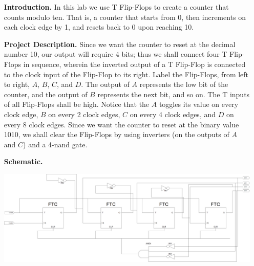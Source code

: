 \documentclass[9pt]{article}
\begin{document}
\begin{enumerate}
   \item[\textbf{Introduction.}]  In this lab we use T Flip-Flops to create a
   counter that counts modulo ten. That is, a counter that starts from 0, then
   increments on each clock edge by 1, and resets back to 0 upon reaching 10.
   \item[\textbf{Project Description.}] Since we want the counter to reset at the
   decimal number 10, our output will require 4 bits; thus we shall connect four
   T Flip-Flops in sequence, wherein the inverted output of a T Flip-Flop is
   connected to the clock input of the Flip-Flop to its right. Label the Flip-Flops, from left to
   right, $A$, $B$, $C$, and $D$.  The output of $A$ represents the low bit of
   the counter, and the output of $B$ represents the next bit, and so on. The T
   inputs of all Flip-Flops shall be high. Notice that the $A$ toggles its value
   on every clock edge, $B$ on every 2 clock edges, $C$ on every 4 clock edges,
   and $D$ on every 8 clock edges. Since we want the counter to reset at the
   binary value 1010, we shall clear the Flip-Flops by using inverters (on the
   outputs of $A$ and $C$) and a 4-nand gate. 
  	\item[\textbf{Schematic.}] \text{ }
   
             \begin{center}
                \includegraphics[width=\textwidth]{schematic.png}
             \end{center} 
   
   
\end{enumerate}
\end{document}
